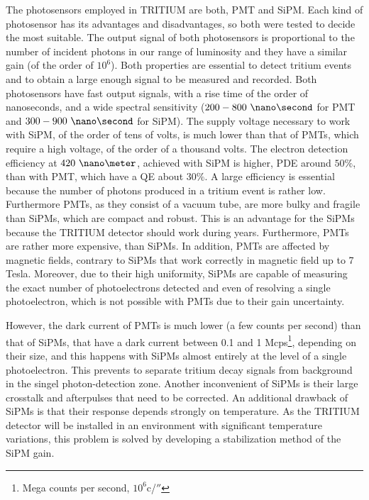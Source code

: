 The photosensors employed in TRITIUM are both, PMT and SiPM. Each kind of photosensor has its advantages and disadvantages, so both were tested to decide the most suitable. The output signal of both photosensors is proportional to the number of incident photons in our range of luminosity and they have a similar gain (of the order of $10^6$). Both properties are essential to detect tritium events and to obtain a large enough signal to be measured and recorded. Both photosensors have fast output signals, with a rise time of the order of nanoseconds, and a wide spectral sensitivity ($200-800~\nano\second$ for PMT and $300-900~\nano\second$ for SiPM). The supply voltage necessary to work with SiPM, of the order of tens of volts, is much lower than that of PMTs, which require a high voltage, of the order of a thousand volts. The electron detection efficiency at $420~\nano\meter$,  achieved with SiPM is higher, PDE around $50\%$, than with PMT, which have a QE about $30\%$. A large efficiency is essential because the number of photons produced in a tritium event is rather low. Furthermore PMTs, as they consist of a vacuum tube, are more bulky and fragile than SiPMs, which are compact and robust. This is an advantage for the SiPMs because the TRITIUM detector should work during years. Furthermore, PMTs are rather more expensive, than SiPMs. In addition, PMTs are affected by magnetic fields, contrary to SiPMs that work correctly in magnetic field up to 7 Tesla. Moreover, due to their high uniformity, SiPMs are capable of measuring the exact number of photoelectrons detected and even of resolving a single photoelectron, which is not possible with PMTs due to their gain uncertainty.

However, the dark current of PMTs is much lower (a few counts per second) than that of SiPMs, that have a dark current between 0.1 and 1 Mcps\footnote{Mega counts per second, $10^6$c/$\second$}, depending on their size, and this happens with SiPMs almost entirely at the level of a single photoelectron. This prevents to separate tritium decay signals from background in the singel photon-detection zone. Another inconvenient of SiPMs is their large crosstalk and afterpulses that need to be corrected. An additional drawback of SiPMs is that their response depends strongly on temperature. As the TRITIUM detector will be installed in an environment with significant temperature variations, this problem is solved by developing a stabilization method of the SiPM gain.